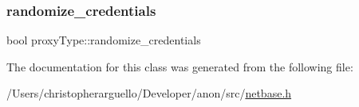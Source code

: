 \mbox{\label{classproxy_type_ad2539071d9857374f3cd3313a93bef55}} 
\subsubsection{\texorpdfstring{randomize\+\_\+credentials}{randomize\_credentials}}
{\footnotesize\ttfamily bool proxy\+Type\+::randomize\+\_\+credentials}



The documentation for this class was generated from the following file\+:\begin{DoxyCompactItemize}
\item 
/\+Users/christopherarguello/\+Developer/anon/src/\mbox{\hyperlink{netbase_8h}{netbase.\+h}}\end{DoxyCompactItemize}
